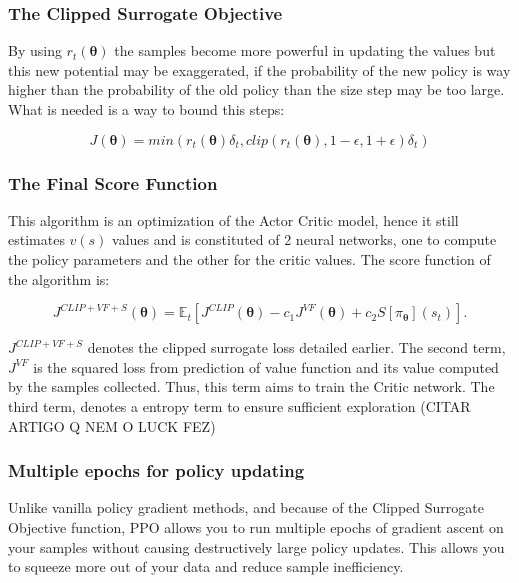 \subsubsection{The Clipped Surrogate Objective}
By using $r_t\left(\bm{\theta}\right)$ the samples become more powerful in updating the values but this new potential may be exaggerated, if the probability of the new policy is way higher than the probability of the old policy than the size step may be too large. What is needed is a way to bound this steps:

\begin{equation}
J\left(\bm{\theta}\right) = min\left(r_t\left(\bm{\theta}\right)\delta_t,clip\left(r_t\left(\bm{\theta}\right),1-\epsilon,1 +\epsilon\right)\delta_t\right)
\end{equation}

\subsubsection{The Final Score Function}

This algorithm is an optimization of the Actor Critic model, hence it still estimates $v\left(s\right)$ values and is constituted of 2 neural networks, one to compute the policy parameters and the other for the critic values. The score function of the algorithm is:

\begin{equation} \label{eq:finalppoloss}
J^{CLIP + VF + S}(\boldsymbol{\theta}) = \mathbb{E}_{t}[J^{CLIP}(\boldsymbol{\theta}) - c_{1} J^{VF}(\boldsymbol{\theta}) + c_{2}S[\pi_{\boldsymbol{\theta}}](s_{t})].
\end{equation}

$J^{CLIP + VF + S}$ denotes the clipped surrogate loss detailed earlier. The second term, $J^{VF}$ is the squared loss from prediction of value function and its value computed by the samples collected. Thus, this term aims to train the Critic network. The third term, denotes a entropy term to ensure sufficient exploration (CITAR ARTIGO Q NEM O LUCK FEZ)

\subsubsection{Multiple epochs for policy updating}

Unlike vanilla policy gradient methods, and because of the Clipped Surrogate Objective function, PPO allows you to run multiple epochs of gradient ascent on your samples without causing destructively large policy updates. This allows you to squeeze more out of your data and reduce sample inefficiency.

